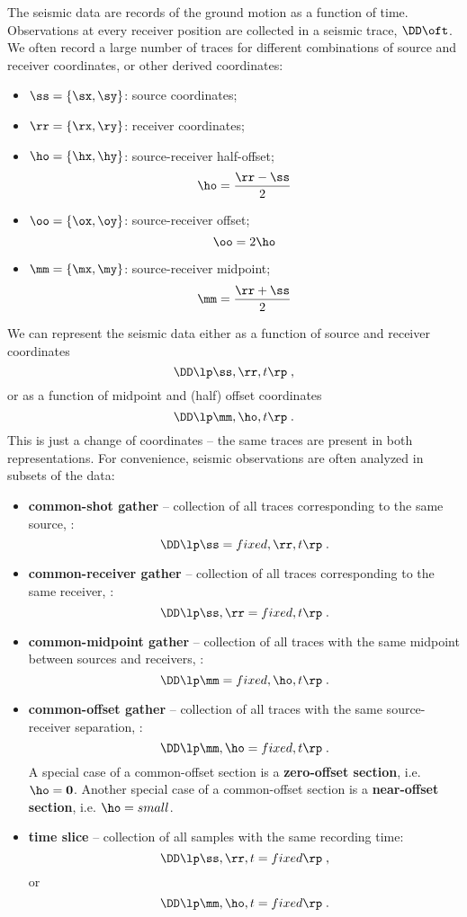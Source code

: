The seismic data are records of the ground motion as a function of
time. Observations at every receiver position are collected in a
seismic trace, $\DD\oft$. We often record a large number of traces for
different combinations of source and receiver coordinates, or other
derived coordinates:
\begin{itemize}
  \item $\ss=\{ \sx, \sy \}$: source coordinates;
  \item $\rr=\{ \rx, \ry \}$: receiver coordinates;
  \item $\ho=\{ \hx, \hy \}$: source-receiver half-offset;
    \[ \ho = \frac{\rr - \ss}{2} \]
  \item $\oo=\{ \ox, \oy \}$: source-receiver offset;
    \[ \oo = 2\ho\]
  \item $\mm=\{ \mx, \my \}$: source-receiver midpoint;
    \[ \mm = \frac{\rr + \ss}{2} \]
\end{itemize}
We can represent the seismic data either as a function of source and
receiver coordinates
%
\[ \DD\lp \ss,\rr,t \rp \;, \]
%
or as a function of midpoint and (half) offset coordinates
%
\[ \DD\lp \mm,\ho,t \rp \;. \]
%
This is just a change of coordinates -- the same traces are present in
both representations. For convenience, seismic observations are often
analyzed in subsets of the data:
\begin{itemize}
\item \textbf{common-shot gather} -- collection of all traces
  corresponding to the same source, :
  \[ \DD\lp \ss=fixed, \rr, t \rp \;.\]
\item \textbf{common-receiver gather} -- collection of all traces
  corresponding to the same receiver, :
  \[ \DD\lp \ss, \rr=fixed, t \rp \;.\]
\item \textbf{common-midpoint gather} -- collection of all traces with
  the same midpoint between sources and receivers, :
  \[ \DD\lp \mm=fixed, \ho, t \rp \;.\]
\item \textbf{common-offset gather} -- collection of all traces with
  the same source-receiver separation, :
  \[ \DD\lp \mm, \ho=fixed, t \rp \;.\] 
  A special case of a common-offset section is a \textbf{zero-offset
    section}, i.e. $\ho=\mathbf{0}$. Another special case of a
  common-offset section is a \textbf{near-offset section},
  i.e. $\ho=small$.
\item \textbf{time slice} -- collection of all samples with the same
  recording time:
  \[ \DD\lp \ss, \rr, t=fixed \rp \;,\]
  or 
  \[ \DD\lp \mm, \ho, t=fixed \rp \;.\]
\end{itemize}

